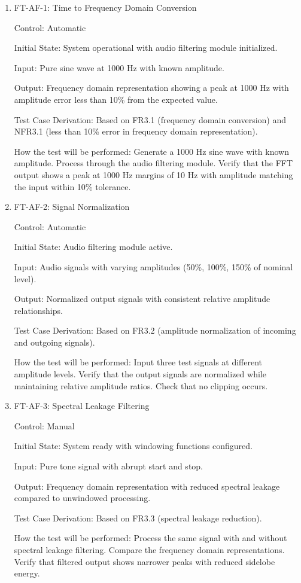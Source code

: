 \documentclass[12pt, titlepage]{article}
\begin{document}
\begin{enumerate}

\item{FT-AF-1: Time to Frequency Domain Conversion\\}

Control: Automatic
					
Initial State: System operational with audio filtering module initialized.
					
Input: Pure sine wave at 1000 Hz with known amplitude.
					
Output: Frequency domain representation showing a peak at 1000 Hz with amplitude
error less than 10\% from the expected value.

Test Case Derivation: Based on FR3.1 (frequency domain conversion) and NFR3.1
(less than 10\% error in frequency domain representation).

How the test will be performed: Generate a 1000 Hz sine wave with known amplitude.
Process through the audio filtering module. Verify that the FFT output shows a
peak at 1000 Hz margins of  10 Hz with amplitude matching the input within 10\% tolerance.

\item{FT-AF-2: Signal Normalization\\}

Control: Automatic
					
Initial State: Audio filtering module active.
					
Input: Audio signals with varying amplitudes (50\%, 100\%, 150\% of nominal
level).
					
Output: Normalized output signals with consistent relative amplitude
relationships.

Test Case Derivation: Based on FR3.2 (amplitude normalization of incoming and
outgoing signals).

How the test will be performed: Input three test signals at different amplitude
levels. Verify that the output signals are normalized while maintaining relative
amplitude ratios. Check that no clipping occurs.

\item{FT-AF-3: Spectral Leakage Filtering\\}

Control: Manual
					
Initial State: System ready with windowing functions configured.
					
Input: Pure tone signal with abrupt start and stop.
					
Output: Frequency domain representation with reduced spectral leakage compared
to unwindowed processing.

Test Case Derivation: Based on FR3.3 (spectral leakage reduction).

How the test will be performed: Process the same signal with and without spectral
leakage filtering. Compare the frequency domain representations. Verify that
filtered output shows narrower peaks with reduced sidelobe energy.

\end{enumerate}
\end{document}
